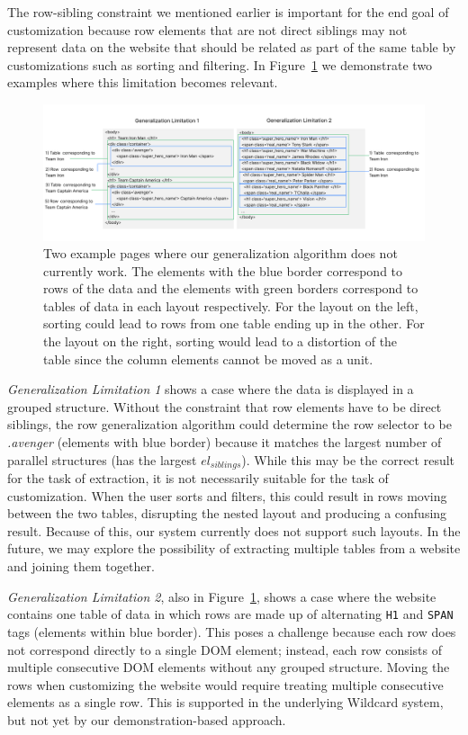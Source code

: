 \documentclass[sigconf,10pt]{acmart}
\begin{document}
The row-sibling constraint we mentioned earlier is important for the end
goal of customization because row elements that are not direct siblings
may not represent data on the website that should be related as part of
the same table by customizations such as sorting and filtering. In
Figure~\ref{fig:limitations} we demonstrate two examples where this
limitation becomes relevant.

\begin{figure}
  \includegraphics[width=\textwidth]{media/limitations.png}
  \caption{\label{fig:limitations} Two example pages where our generalization algorithm does not currently work. The elements with the blue border correspond to rows of the data and the elements with green borders correspond to tables of data in each layout respectively. For the layout on the left, sorting could lead to rows from one table ending up in the other. For the layout on the right, sorting would lead to a distortion of the table since the column elements cannot be moved as a unit.}
\end{figure}

\emph{Generalization Limitation 1} shows a case where the data is
displayed in a grouped structure. Without the constraint that row
elements have to be direct siblings, the row generalization algorithm
could determine the row selector to be \emph{.avenger} (elements with
blue border) because it matches the largest number of parallel
structures (has the largest \(el_{siblings}\)). While this may be the
correct result for the task of extraction, it is not necessarily
suitable for the task of customization. When the user sorts and filters,
this could result in rows moving between the two tables, disrupting the
nested layout and producing a confusing result. Because of this, our
system currently does not support such layouts. In the future, we may
explore the possibility of extracting multiple tables from a website and
joining them together.

\emph{Generalization Limitation 2}, also in
Figure~\ref{fig:limitations}, shows a case where the website contains
one table of data in which rows are made up of alternating \texttt{H1}
and \texttt{SPAN} tags (elements within blue border). This poses a
challenge because each row does not correspond directly to a single DOM
element; instead, each row consists of multiple consecutive DOM elements
without any grouped structure. Moving the rows when customizing the
website would require treating multiple consecutive elements as a single
row. This is supported in the underlying Wildcard system, but not yet by
our demonstration-based approach.
\end{document}
